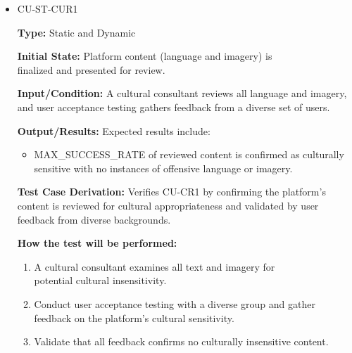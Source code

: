 \documentclass[12pt, titlepage]{article}
\begin{document}
\begin{itemize} 
  \item CU-ST-CUR1
  \begin{mdframed}[linewidth=0.5mm] 
    \textbf{Type:} Static and Dynamic \par 
    \textbf{Initial State:} Platform content (language and imagery) is \\finalized and presented for review. \par 
    \textbf{Input/Condition:} A cultural consultant reviews all language and imagery, and user acceptance testing gathers feedback from a diverse set of users. \par 
    \textbf{Output/Results:} Expected results include: 
    \begin{itemize} 
      \item MAX\_SUCCESS\_RATE of reviewed content is confirmed as culturally sensitive with no instances of offensive language or imagery. 
    \end{itemize} \par 
    \textbf{Test Case Derivation:} Verifies CU-CR1 by confirming the platform’s content is reviewed for cultural appropriateness and validated by user feedback from diverse backgrounds. \par 
    \textbf{How the test will be performed:} 
    \begin{enumerate}[noitemsep] 
      \item A cultural consultant examines all text and imagery for \\potential cultural insensitivity. 
      \item Conduct user acceptance testing with a diverse group and gather feedback on the platform's cultural sensitivity. 
      \item Validate that all feedback confirms no culturally insensitive content. 
    \end{enumerate} 
  \end{mdframed}


\end{itemize}
\end{document}
